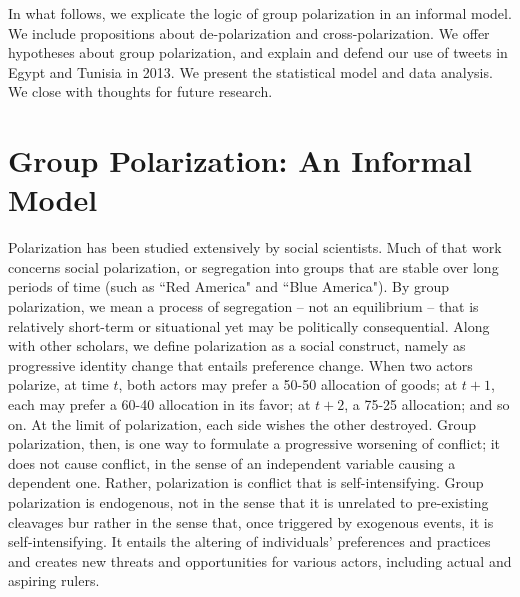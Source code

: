 \documentclass[12pt]{article}
\begin{document}
In what follows, we explicate the logic of group polarization in an informal model.  We include propositions about de-polarization and cross-polarization.  We offer hypotheses about group polarization, and explain and defend our use of tweets in Egypt and Tunisia in 2013.  We present the statistical model and data analysis.  We close with thoughts for future research.


\section*{Group Polarization: An Informal Model}
Polarization has been studied extensively by social scientists.  Much of that work concerns social polarization, or segregation into groups that are stable over long periods of time (such as ``Red America" and ``Blue America").   By group polarization, we mean a process of segregation – not an equilibrium – that is relatively short-term or situational yet may be politically consequential.   Along with other scholars, we define polarization as a social construct, namely as progressive identity change that entails preference change.   When two actors polarize, at time $t$, both actors may prefer a 50-50 allocation of goods; at $t+1$, each may prefer a 60-40 allocation in its favor; at $t+2$, a 75-25 allocation; and so on.  At the limit of polarization, each side wishes the other destroyed.   Group polarization, then, is one way to formulate a progressive worsening of conflict; it does not cause conflict, in the sense of an independent variable causing a dependent one.  Rather, polarization is conflict that is self-intensifying.  Group polarization is endogenous, not in the sense that it is unrelated to pre-existing cleavages bur rather in the sense that, once triggered by exogenous events, it is self-intensifying.   It entails the altering of individuals' preferences and practices and creates new threats and opportunities for various actors, including actual and aspiring rulers.  
\end{document}
